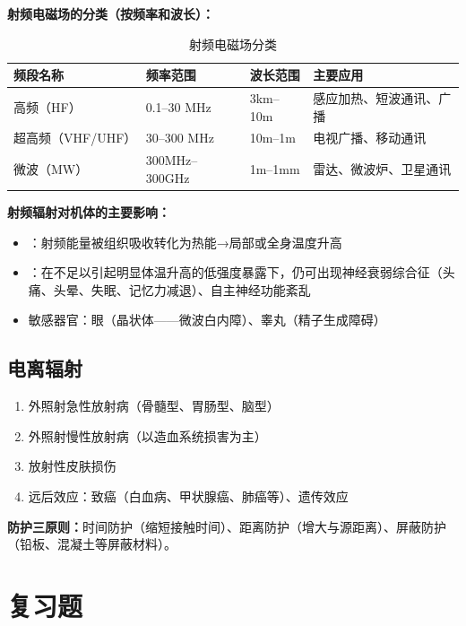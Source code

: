 \begin{defbox}
\textbf{射频电磁场的分类（按频率和波长）：}
\begin{table}[H]
\centering
\caption{射频电磁场分类}
\begin{tabularx}{\textwidth}{llll}
\hline
\textbf{频段名称} & \textbf{频率范围} & \textbf{波长范围} & \textbf{主要应用} \\
\hline
高频（HF） & 0.1--30 MHz & 3km--10m & 感应加热、短波通讯、广播 \\
超高频（VHF/UHF）& 30--300 MHz & 10m--1m & 电视广播、移动通讯 \\
微波（MW） & 300MHz--300GHz & 1m--1mm & 雷达、微波炉、卫星通讯 \\
\hline
\end{tabularx}
\end{table}

\textbf{射频辐射对机体的主要影响：}
\begin{itemize}[leftmargin=*]
    \item {}：射频能量被组织吸收转化为热能→局部或全身温度升高
    \item {}：在不足以引起明显体温升高的低强度暴露下，仍可出现神经衰弱综合征（头痛、头晕、失眠、记忆力减退）、自主神经功能紊乱
    \item 敏感器官：眼（晶状体——微波白内障）、睾丸（精子生成障碍）
\end{itemize}
\end{defbox}

\subsection{电离辐射}

\begin{enumerate}[leftmargin=*]
    \item 外照射急性放射病（骨髓型、胃肠型、脑型）
    \item 外照射慢性放射病（以造血系统损害为主）
    \item 放射性皮肤损伤
    \item 远后效应：致癌（白血病、甲状腺癌、肺癌等）、遗传效应
\end{enumerate}

\textbf{防护三原则：}时间防护（缩短接触时间）、距离防护（增大与源距离）、屏蔽防护（铅板、混凝土等屏蔽材料）。

\section{复习题}


